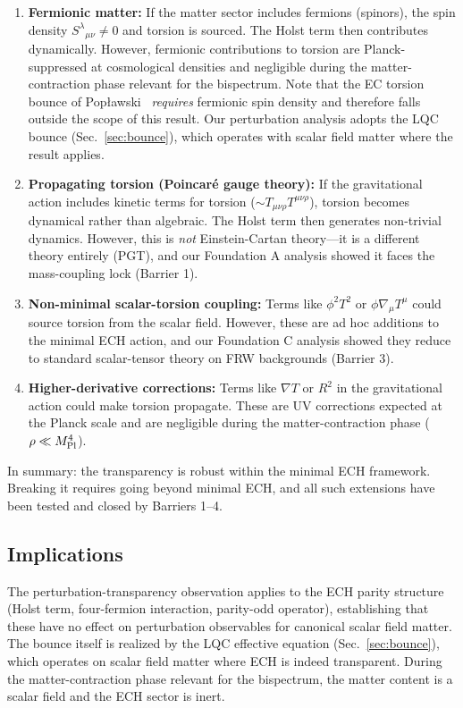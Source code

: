 \documentclass[aps,prd,twocolumn,superscriptaddress,showpacs,preprintnumbers,nofootinbib,longbibliography,floatfix]{revtex4-2}
\newcommand{\MPl}{M_{\rm Pl}}
\begin{document}
\begin{enumerate}
\item \textbf{Fermionic matter:} If the matter sector includes fermions (spinors), the spin density $S^\lambda{}_{\mu\nu} \neq 0$ and torsion is sourced. The Holst term then contributes dynamically. However, fermionic contributions to torsion are Planck-suppressed at cosmological densities and negligible during the matter-contraction phase relevant for the bispectrum. Note that the EC torsion bounce of Pop\l{}awski~\cite{Poplawski2012} \emph{requires} fermionic spin density and therefore falls outside the scope of this result. Our perturbation analysis adopts the LQC bounce (Sec.~\ref{sec:bounce}), which operates with scalar field matter where the result applies.

\item \textbf{Propagating torsion (Poincar\'e gauge theory):} If the gravitational action includes kinetic terms for torsion ($\sim T_{\mu\nu\rho}T^{\mu\nu\rho}$), torsion becomes dynamical rather than algebraic. The Holst term then generates non-trivial dynamics. However, this is \emph{not} Einstein-Cartan theory---it is a different theory entirely (PGT), and our Foundation A analysis showed it faces the mass-coupling lock (Barrier 1).

\item \textbf{Non-minimal scalar-torsion coupling:} Terms like $\phi^2 T^2$ or $\phi \nabla_\mu T^\mu$ could source torsion from the scalar field. However, these are ad hoc additions to the minimal ECH action, and our Foundation C analysis showed they reduce to standard scalar-tensor theory on FRW backgrounds (Barrier 3).

\item \textbf{Higher-derivative corrections:} Terms like $\nabla T$ or $R^2$ in the gravitational action could make torsion propagate. These are UV corrections expected at the Planck scale and are negligible during the matter-contraction phase ($\rho \ll \MPl^4$).
\end{enumerate}

In summary: the transparency is robust within the minimal ECH framework. Breaking it requires going beyond minimal ECH, and all such extensions have been tested and closed by Barriers 1--4.

\subsection{Implications}

The perturbation-transparency observation applies to the ECH parity structure (Holst term, four-fermion interaction, parity-odd operator), establishing that these have no effect on perturbation observables for canonical scalar field matter. The bounce itself is realized by the LQC effective equation (Sec.~\ref{sec:bounce}), which operates on scalar field matter where ECH is indeed transparent. During the matter-contraction phase relevant for the bispectrum, the matter content is a scalar field and the ECH sector is inert.
\end{document}
